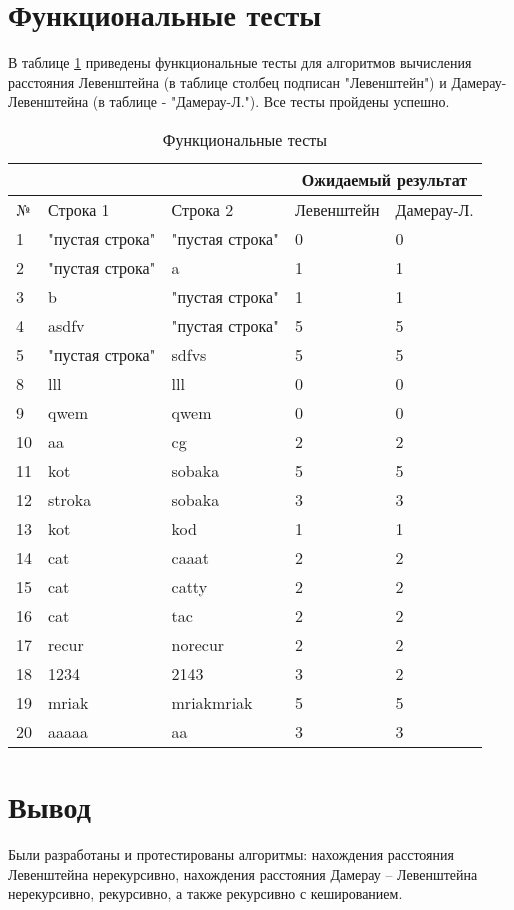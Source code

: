 \section{Функциональные тесты}
В таблице \ref{tabular:functional_test} приведены функциональные тесты для алгоритмов вычисления расстояния Левенштейна (в таблице столбец подписан "Левенштейн") и Дамерау-Левенштейна (в таблице - "Дамерау-Л."). Все тесты пройдены успешно.


\begin{table}[h]
    \begin{center}
    \begin{threeparttable}
    \captionsetup{justification=raggedright,singlelinecheck=off}	\caption{\label{tabular:functional_test} Функциональные тесты}
		\begin{tabular}{|l|l|l|l|l|}
			\hline
			& & & \multicolumn{2}{c|}{Ожидаемый результат} \\
			\hline
			№&Строка 1&Строка 2&Левенштейн&Дамерау-Л. \\
			\hline
			1&"пустая строка"&"пустая строка"&0&0 \\
			\hline
			2&"пустая строка"&a&1&1 \\
			\hline
			3&b&"пустая строка"&1&1 \\
			\hline
			4&asdfv&"пустая строка"&5&5 \\
			\hline
			5&"пустая строка"&sdfvs&5&5 \\
			\hline
			8&lll&lll&0&0 \\
			\hline
			9&qwem&qwem&0&0 \\
			\hline
			10&aa&cg&2&2 \\
			\hline
			11&kot&sobaka&5&5 \\
			\hline
			12&stroka&sobaka&3&3 \\
			\hline
			13&kot&kod&1&1 \\
			\hline
			14&cat&caaat&2&2 \\
			\hline
			15&cat&catty&2&2 \\
			\hline
			16&cat&tac&2&2 \\
			\hline
			17&recur&norecur&2&2 \\
			\hline
			18&1234&2143&3&2 \\
			\hline
			19&mriak&mriakmriak&5&5 \\
			\hline
			20&aaaaa&aa&3&3 \\
			\hline
		\end{tabular}
	\end{threeparttable}
	\end{center}
\end{table}


\newpage

\section*{Вывод}

Были разработаны и протестированы алгоритмы: нахождения расстояния Левенштейна нерекурсивно, нахождения расстояния Дамерау -- Левенштейна нерекурсивно, рекурсивно, а также рекурсивно с кешированием.
